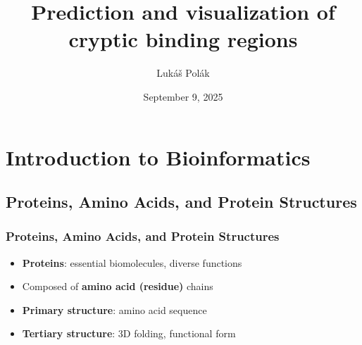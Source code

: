 \documentclass[aspectratio=169]{beamer}
\title[PredictionAndVisualization]{Prediction and visualization of cryptic binding regions}
\author[Polak L.]{Lukáš Polák}
\institute[CUNI]{Faculty of Mathematics and Physics, Charles University}
\date{September 9, 2025}
\begin{document}


\begin{frame}[plain]
  \titlepage
\end{frame}








\section{Introduction to Bioinformatics}

\subsection{Proteins, Amino Acids, and Protein Structures}

\begin{frame}
  \frametitle{Proteins, Amino Acids, and Protein Structures}

  \begin{itemize}
    \item \textbf{Proteins}: essential biomolecules, diverse functions
    \item Composed of \textbf{amino acid (residue)} chains
    \item \textbf{Primary structure}: amino acid sequence
    \item \textbf{Tertiary structure}: 3D folding, functional form
  \end{itemize}

\end{frame}
\end{document}
